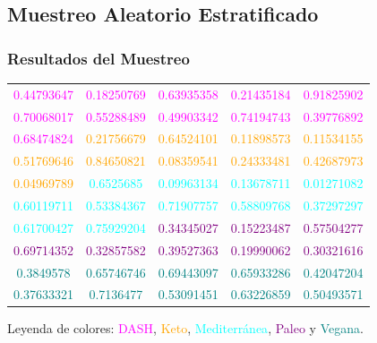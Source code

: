 \documentclass[12pt,a4paper]{article}
\begin{document}
    \subsection{Muestreo Aleatorio Estratificado}

    \subsubsection{Resultados del Muestreo}
        \begin{center}
            \begin{tabular}{ccccc}
                \textcolor{magenta}{0.44793647} & \textcolor{magenta}{0.18250769} & \textcolor{magenta}{0.63935358} & \textcolor{magenta}{0.21435184} & \textcolor{magenta}{0.91825902} \\
                \textcolor{magenta}{0.70068017} & \textcolor{magenta}{0.55288489} & \textcolor{magenta}{0.49903342} & \textcolor{magenta}{0.74194743} & \textcolor{magenta}{0.39776892} \\
                \textcolor{magenta}{0.68474824} & \textcolor{orange}{0.21756679} & \textcolor{orange}{0.64524101} & \textcolor{orange}{0.11898573} & \textcolor{orange}{0.11534155} \\
                \textcolor{orange}{0.51769646} & \textcolor{orange}{0.84650821} & \textcolor{orange}{0.08359541} & \textcolor{orange}{0.24333481} & \textcolor{orange}{0.42687973} \\
                \textcolor{orange}{0.04969789} & \textcolor{cyan}{0.6525685}  & \textcolor{cyan}{0.09963134} & \textcolor{cyan}{0.13678711} & \textcolor{cyan}{0.01271082} \\
                \textcolor{cyan}{0.60119711} & \textcolor{cyan}{0.53384367} & \textcolor{cyan}{0.71907757} & \textcolor{cyan}{0.58809768} & \textcolor{cyan}{0.37297297} \\
                \textcolor{cyan}{0.61700427} & \textcolor{cyan}{0.75929204} & \textcolor{purple}{0.34345027} & \textcolor{purple}{0.15223487} & \textcolor{purple}{0.57504277} \\
                \textcolor{purple}{0.69714352} & \textcolor{purple}{0.32857582} & \textcolor{purple}{0.39527363} & \textcolor{purple}{0.19990062} & \textcolor{purple}{0.30321616} \\
                \textcolor{teal}{0.3849578}  & \textcolor{teal}{0.65746746} & \textcolor{teal}{0.69443097} & \textcolor{teal}{0.65933286} & \textcolor{teal}{0.42047204} \\
                \textcolor{teal}{0.37633321} & \textcolor{teal}{0.7136477}  & \textcolor{teal}{0.53091451} & \textcolor{teal}{0.63226859} & \textcolor{teal}{0.50493571} 
            \end{tabular}
        \end{center}
        Leyenda de colores: \textcolor{magenta}{DASH}, \textcolor{orange}{Keto}, \textcolor{cyan}{Mediterránea}, 
        \textcolor{purple}{Paleo} y \textcolor{teal}{Vegana}.
\end{document}
